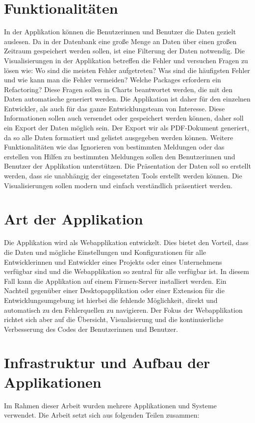 \section{Funktionalitäten}
In der Applikation können die Benutzerinnen und Benutzer die Daten gezielt auslesen. Da in der Datenbank eine große Menge an Daten über einen großen Zeitraum gespeichert werden sollen, ist eine Filterung der Daten notwendig. Die Visualisierungen in der Applikation betreffen die Fehler und versuchen Fragen zu lösen wie: Wo sind die meisten Fehler aufgetreten? Was sind die häufigsten Fehler und wie kann man die Fehler vermeiden? Welche Packages erfordern ein Refactoring? Diese Fragen sollen in Charts beantwortet werden, die mit den Daten automatische generiert werden. Die Applikation ist daher für den einzelnen Entwickler, als auch für das ganze Entwicklungsteam von Interesse. Diese Informationen sollen auch versendet oder gespeichert werden können, daher soll ein Export der Daten möglich sein. Der Export wir als PDF-Dokument generiert, da so alle Daten formatiert und gelistet ausgegeben werden können. Weitere Funktionalitäten wie das Ignorieren von bestimmten Meldungen oder das erstellen von Hilfen zu bestimmten Meldungen sollen den Benutzerinnen und Benutzer der Applikation unterstützen. Die Präsentation der Daten soll so erstellt werden, dass sie unabhängig der eingesetzten Tools erstellt werden können. Die Visualisierungen sollen modern und einfach verständlich präsentiert werden.
\section{Art der Applikation}
Die Applikation wird als Webapplikation entwickelt. Dies bietet den Vorteil, dass die Daten und mögliche Einstellungen und Konfigurationen für alle Entwicklerinnen und Entwickler eines Projekts oder eines Unternehmens verfügbar sind und die Webapplikation so zentral für alle verfügbar ist. In diesem Fall kann die Applikation auf einem Firmen-Server installiert werden. Ein Nachteil gegenüber einer Desktopapplikation oder einer Extension für die Entwicklungsumgebung ist hierbei die fehlende Möglichkeit, direkt und automatisch zu den Fehlerquellen zu navigieren. Der Fokus der Webapplikation richtet sich aber auf die Übersicht, Visualisierung und die kontinuierliche Verbesserung des Codes der Benutzerinnen und Benutzer. 
\section{Infrastruktur und Aufbau der Applikationen} 
Im Rahmen dieser Arbeit wurden mehrere Applikationen und Systeme verwendet. Die Arbeit setzt sich aus folgenden Teilen zusammen:

